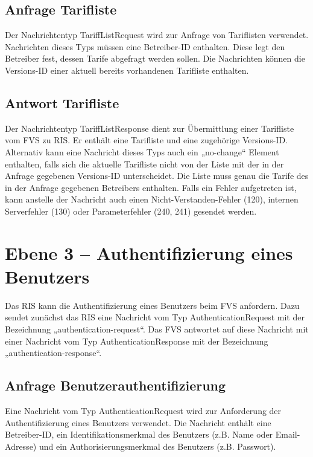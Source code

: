 

\subsection{Anfrage Tarifliste}
Der Nachrichtentyp TariffListRequest wird zur Anfrage von Tariflisten verwendet. Nachrichten dieses Typs müssen eine Betreiber-ID enthalten. Diese legt den Betreiber fest, dessen Tarife abgefragt werden sollen. Die Nachrichten können die Versions-ID einer aktuell bereits vorhandenen Tarifliste enthalten.



\subsection{Antwort Tarifliste}
Der Nachrichtentyp TariffListResponse dient zur Übermittlung einer Tarifliste vom FVS zu RIS. Er enthält eine Tarifliste und eine zugehörige Versions-ID. Alternativ kann eine Nachricht dieses Typs auch ein „no-change“ Element enthalten, falls sich die aktuelle Tarifliste nicht von der Liste mit der in der Anfrage gegebenen Versions-ID  unterscheidet. Die Liste muss genau die Tarife des in der Anfrage gegebenen Betreibers enthalten. Falls ein Fehler aufgetreten ist, kann anstelle der Nachricht auch einen Nicht-Verstanden-Fehler (120), internen Serverfehler (130) oder Parameterfehler (240, 241) gesendet werden.




\section{Ebene 3 -- Authentifizierung eines Benutzers}
Das RIS kann die Authentifizierung eines Benutzers beim FVS anfordern. Dazu sendet zunächst das RIS eine Nachricht vom Typ AuthenticationRequest mit der Bezeichnung „authentication-request“. Das FVS antwortet auf diese Nachricht mit einer Nachricht vom Typ AuthenticationResponse mit der Bezeichnung „authentication-response“.



\subsection{Anfrage Benutzerauthentifizierung}
Eine Nachricht vom Typ AuthenticationRequest wird zur Anforderung der Authentifizierung eines Benutzers verwendet. Die Nachricht enthält eine Betreiber-ID, ein Identifikationsmerkmal des Benutzers (z.B. Name oder Email-Adresse) und ein Authorisierungsmerkmal des Benutzers (z.B. Passwort).

